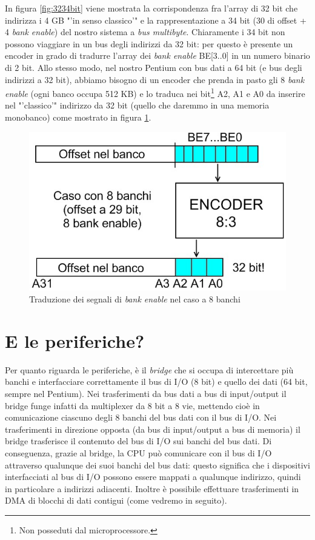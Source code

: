 In figura \ref{fig:3234bit} viene mostrata la corrispondenza fra l'array di 32 bit che indirizza i 4 GB "'in senso classico'" e la rappresentazione a 34 bit (30 di offset + 4 \textit{bank enable}) del nostro sistema a \textit{bus multibyte}. Chiaramente i 34 bit non possono viaggiare in un bus degli indirizzi da 32 bit: per questo è presente un encoder in grado di tradurre l'array dei \textit{bank enable} BE[3..0] in un numero binario di 2 bit. Allo stesso modo, nel nostro Pentium con bus dati a 64 bit (e bus degli indirizzi a 32 bit), abbiamo bisogno di un encoder che prenda in pasto gli 8 \textit{bank enable} (ogni banco occupa 512 KB) e lo traduca nei bit\footnote{Non posseduti dal microprocessore.} A2, A1 e A0 da inserire nel "'classico'" indirizzo da 32 bit (quello che daremmo in una memoria monobanco) come mostrato in figura \ref{fig:banktraduzione64}.

\begin{figure}[!h]
\centering
\includegraphics[width=0.5\columnwidth]{img/banktraduzione64}
\caption{Traduzione dei segnali di \textit{bank enable} nel caso a 8 banchi}
\label{fig:banktraduzione64}
\end{figure}

\section{E le periferiche?}
\label{sec:perifericheCacchio}

Per quanto riguarda le periferiche, è il \textit{bridge} che si occupa di intercettare più banchi e interfacciare correttamente il bus di I/O (8 bit) e quello dei dati (64 bit, sempre nel Pentium).
Nei trasferimenti da bus dati a bus di input/output il bridge funge infatti da multiplexer da 8 bit a 8 vie, mettendo cioè in comunicazione ciascuno degli 8 banchi del bus dati con il bus di I/O. Nei trasferimenti in direzione opposta (da bus di input/output a bus di memoria) il bridge trasferisce il contenuto del bus di I/O sui banchi del bus dati. Di conseguenza, grazie al bridge, la CPU può comunicare con il bus di I/O attraverso qualunque dei suoi banchi del bus dati: questo significa che i dispositivi interfacciati al bus di I/O possono essere mappati a qualunque indirizzo, quindi in particolare a indirizzi adiacenti. Inoltre è possibile effettuare trasferimenti in DMA di blocchi di dati contigui (come vedremo in seguito).


